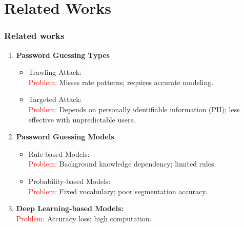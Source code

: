 \documentclass[
	12pt, %
]{beamer}
\begin{document}
\section{Related Works}
\begin{frame}
	\frametitle{Related works}
	
	\begin{enumerate}
		\item \textbf{Password Guessing Types}
		\begin{itemize}
			\item Trawling Attack:\\
			\textcolor{red}{Problem:} Misses rate patterns; requires accurate modeling.
			
			\item Targeted Attack:\\
			\textcolor{red}{Problem:} Depends on personally identifiable information (PII); less effective with unpredictable users.
		\end{itemize}
		
		
		\item \textbf{Password Guessing Models}
		\begin{itemize}
			\item Rule-based Models:\\
			\textcolor{red}{Problem:} Background knowledge dependency; limited rules.
			
			\item Probability-based Models:\\
			\textcolor{red}{Problem:} Fixed vocabulary; poor segmentation accuracy.
		\end{itemize}
		
		
		\item \textbf{Deep Learning-based Models:}\\
		\textcolor{red}{Problem:} Accuracy loss; high computation.
		
	\end{enumerate}
\end{frame}



\end{document}
